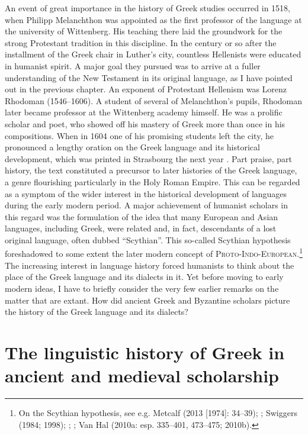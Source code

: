 An event of great importance in the history of Greek studies occurred in 1518, when Philipp Melanchthon was appointed as the first professor of the language at the university of Wittenberg. His teaching there laid the groundwork for the strong Protestant tradition in this discipline. In the century or so after the installment of the Greek chair in Luther’s city, countless Hellenists were educated in humanist spirit. A major goal they pursued was to arrive at a fuller understanding of the New Testament in its original language, as I have pointed out in the previous chapter. An exponent of Protestant Hellenism was Lorenz Rhodoman (1546–1606). A student of several of Melanchthon’s pupils, Rhodoman later became professor at the Wittenberg academy himself. He was a prolific scholar and poet, who showed off his mastery of Greek more than once in his compositions. When in 1604 one of his promising students left the city, he pronounced a lengthy oration on the Greek language and its historical development, which was printed in Strasbourg the next year \citep{Rhodoman1605}. Part praise, part history, the text constituted a precursor to later histories of the Greek language, a genre flourishing particularly in the Holy Roman Empire. This can be regarded as a symptom of the wider interest in the historical development of languages during the early modern period. A major achievement of humanist scholars in this regard was the formulation of the idea that many European and Asian languages, including Greek, were related and, in fact, descendants of a lost original language, often dubbed “Scythian”. This so-called Scythian hypothesis foreshadowed to some extent the later modern concept of \textsc{Proto-Indo-European}.\footnote{On the Scythian hypothesis, see e.g. Metcalf (2013 [1974]: 34–39); \citet{Droixhe1980}; Swiggers (1984; 1998); \citet{Villani2003}; \citet{Considine2010}; Van Hal (2010a: esp. 335–401, 473–475; 2010b).} The increasing interest in language history forced humanists to think about the place of the Greek language and its dialects in it. Yet before moving to early modern ideas, I have to briefly consider the very few earlier remarks on the matter that are extant. How did ancient Greek and Byzantine scholars picture the history of the Greek language and its dialects?

\section{The linguistic history of Greek in ancient and medieval scholarship}

